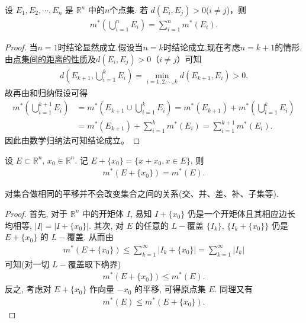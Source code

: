 \documentclass[../../main.tex]{subfiles}%
\begin{document}
\begin{corollary}\label{corollary:距离大于零的两个点集的外测度满足可数可加性}
设 \(E_1, E_2,\cdots,E_n\) 是 \(\mathbb{R}^n\) 中的$n$个点集. 若 \(d(E_i, E_j)>0\)($i\ne j$)，则
\begin{align*}
m^*\left( \bigcup_{i=1}^n{E_i} \right) =\sum_{i=1}^n{m^*\left( E_i \right)}.
\end{align*}
\end{corollary}
\begin{proof}

当$n=1$时结论显然成立.假设当$n=k$时结论成立,现在考虑$n=k+1$的情形.由\hyperref[proposition:点集间的距离的性质]{点集间的距离的性质}及$d(E_i,E_j)>0$（$i\neq j$）可知
\begin{align*}
d\left(E_{k + 1},\bigcup_{i = 1}^kE_i\right)=\min_{i = 1,2,\cdots,k}d\left(E_{k + 1},E_i\right)>0.
\end{align*}
故再由和归纳假设可得
\begin{align*}
m^*\left(\bigcup_{i = 1}^{k + 1}E_i\right)&=m^*\left(E_{k + 1}\cup\bigcup_{i = 1}^kE_i\right)=m^*\left(E_{k + 1}\right)+m^*\left(\bigcup_{i = 1}^kE_i\right)\\
&=m^*\left(E_{k + 1}\right)+\sum_{i = 1}^km^*(E_i)
=\sum_{i = 1}^{k + 1}m^*(E_i).
\end{align*}
因此由数学归纳法可知结论成立。 

\end{proof}

\begin{theorem}[外测度的平移不变性]\label{theorem:外测度的平移不变性}
设 \(E \subset \mathbb{R}^n\), \(x_0 \in \mathbb{R}^n\). 记 \(E + \{x_0\} = \{x + x_0, x \in E\}\), 则
\begin{align}
m^*(E + \{x_0\}) = m^*(E). \label{eq:2.1}
\end{align}
\end{theorem}
\begin{remark}
对集合做相同的平移并不会改变集合之间的关系(交、并、差、补、子集等).
\end{remark}
\begin{proof}

首先, 对于 \(\mathbb{R}^n\) 中的开矩体 \(I\), 易知 \(I + \{x_0\}\) 仍是一个开矩体且其相应边长均相等, \(|I| = |I + \{x_0\}|\). 其次, 对 \(E\) 的任意的 \(L -\)覆盖 \(\{I_k\}\), \(\{I_k + \{x_0\}\}\) 仍是 \(E + \{x_0\}\) 的 \(L -\)覆盖. 从而由
\begin{align*}
m^*(E + \{x_0\}) \leqslant  \sum_{k = 1}^{\infty} |I_k + \{x_0\}| = \sum_{k = 1}^{\infty} |I_k|
\end{align*}
可知(对一切 \(L -\)覆盖取下确界)
\begin{align*}
m^*(E + \{x_0\}) \leqslant  m^*(E).
\end{align*}
反之, 考虑对 \(E + \{x_0\}\) 作向量 \(-x_0\) 的平移, 可得原点集 \(E\). 同理又有
\begin{align*}
m^*(E) \leqslant  m^*(E + \{x_0\}).
\end{align*} 

\end{proof}
\end{document}
